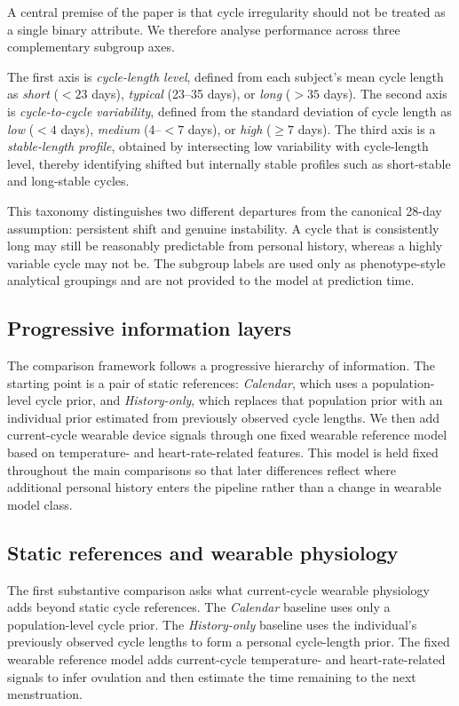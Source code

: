 \documentclass[conference]{IEEEtran}
\begin{document}
A central premise of the paper is that cycle irregularity should not be treated as a single binary attribute. We therefore analyse performance across three complementary subgroup axes.

The first axis is \textit{cycle-length level}, defined from each subject's mean cycle length as \textit{short} ($<23$ days), \textit{typical} (23--35 days), or \textit{long} ($>35$ days). The second axis is \textit{cycle-to-cycle variability}, defined from the standard deviation of cycle length as \textit{low} ($<4$ days), \textit{medium} (4--$<7$ days), or \textit{high} ($\geq 7$ days). The third axis is a \textit{stable-length profile}, obtained by intersecting low variability with cycle-length level, thereby identifying shifted but internally stable profiles such as short-stable and long-stable cycles.

This taxonomy distinguishes two different departures from the canonical 28-day assumption: persistent shift and genuine instability. A cycle that is consistently long may still be reasonably predictable from personal history, whereas a highly variable cycle may not be. The subgroup labels are used only as phenotype-style analytical groupings and are not provided to the model at prediction time.

\subsection{Progressive information layers}

The comparison framework follows a progressive hierarchy of information. The starting point is a pair of static references: \textit{Calendar}, which uses a population-level cycle prior, and \textit{History-only}, which replaces that population prior with an individual prior estimated from previously observed cycle lengths. We then add current-cycle wearable device signals through one fixed wearable reference model based on temperature- and heart-rate-related features. This model is held fixed throughout the main comparisons so that later differences reflect where additional personal history enters the pipeline rather than a change in wearable model class.

\subsection{Static references and wearable physiology}

The first substantive comparison asks what current-cycle wearable physiology adds beyond static cycle references. The \textit{Calendar} baseline uses only a population-level cycle prior. The \textit{History-only} baseline uses the individual's previously observed cycle lengths to form a personal cycle-length prior. The fixed wearable reference model adds current-cycle temperature- and heart-rate-related signals to infer ovulation and then estimate the time remaining to the next menstruation.
\end{document}
